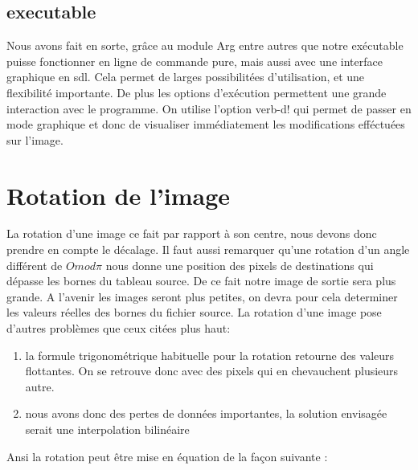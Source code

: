 \documentclass[]{report}
\begin{document}
        \subsection{executable}
        Nous avons fait en sorte, grâce au module Arg entre autres que notre exécutable puisse fonctionner en ligne de commande pure, mais aussi avec une interface graphique en sdl. Cela permet de larges possibilitées d'utilisation, et une flexibilité importante.
        De plus les options d'exécution permettent une grande interaction avec le programme. On utilise l'option \!verb-d! qui permet de passer en mode graphique et donc de visualiser immédiatement les modifications efféctuées sur l'image.
        \section{Rotation de l'image}
        \label{principe}
        La rotation d'une image ce fait par rapport à son centre, nous devons donc prendre en compte le décalage.
        Il faut aussi remarquer qu'une rotation d'un angle différent de $O mod \pi$ nous donne une position des
        pixels de destinations qui dépasse les bornes du tableau source. De ce fait notre image
        de sortie sera plus grande. A l'avenir les images seront plus petites, on devra pour cela determiner les valeurs réelles
        des bornes du fichier source.
        La rotation d'une image pose d'autres problèmes que ceux citées plus haut:
        \begin{enumerate}
          \item la formule trigonométrique habituelle pour la rotation retourne des valeurs flottantes. On se retrouve donc avec des pixels qui en chevauchent plusieurs autre.
          \item nous avons donc des pertes de données importantes, la solution envisagée serait une interpolation bilinéaire
        \end{enumerate}
        Ansi la rotation peut être mise en équation de la façon suivante :
\end{document}
